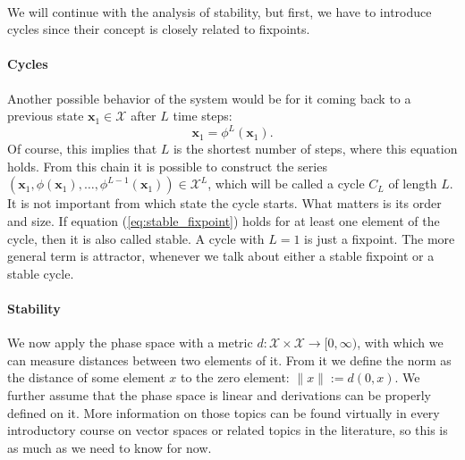 \paragraph*{}
We will continue with the analysis of stability, but first, we have to introduce cycles since their concept is closely related to fixpoints.

\paragraph*{Cycles}
Another possible behavior of the system would be for it coming back to a previous state $ \boldsymbol{x}_1\in \mathcal{X} $ after $ L $ time steps:
\begin{equation}
\boldsymbol{x}_1 = \phi^L(\boldsymbol{x}_1).
\end{equation}
Of course, this implies that $ L $ is the shortest number of steps, where this equation holds. From this chain it is possible to construct the series $ \left(\boldsymbol{x}_1,\phi(\boldsymbol{x}_1),\dots,\phi^{L-1}(\boldsymbol{x}_1) \right) \in \mathcal{X}^L $, which will be called a cycle $ C_L $ of length 
$ L $. It is not important from which state the cycle starts. What matters is its order and size. If equation (\ref{eq:stable_fixpoint}) holds for at least one element of the cycle, then it is also called stable. A cycle with $ L=1 $ is just a fixpoint. The more general term is attractor, whenever we talk about either a stable fixpoint or a stable cycle.

\paragraph*{Stability}
We now apply the phase space with a metric $d : \mathcal{X}\times\mathcal{X} \longrightarrow [0,\infty) $, with which we can measure distances between two elements of it. From it we define the norm as the distance of some element $x$ to the zero element: $\|x\|:=d(0,x)$. We further assume that the phase space is linear and derivations can be properly defined on it. More information on those topics can be found virtually in every introductory course on vector spaces or related topics in the literature, so this is as much as we need to know for now. 

